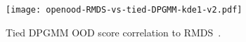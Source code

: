 \begin{figure}[ht]
    \centering
    \texttt{[image: openood-RMDS-vs-tied-DPGMM-kde1-v2.pdf]}
    \caption{Tied DPGMM OOD score correlation to RMDS~\cite{ren21rmds}.}
    \label{fig:mds-tied-hist}
\end{figure}
